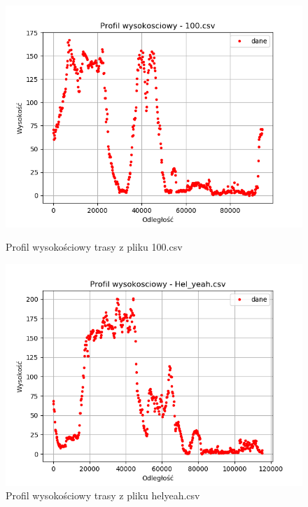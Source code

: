 \documentclass{article} %
\begin{document}
\begin{figure}[h!]
    \centering
    \begin{minipage}[b]{0.4\textwidth}
        \includegraphics[width=\textwidth]{profile_wysokosciowe/100_pw.png}
        \caption{Profil wysokościowy trasy z pliku 100.csv}
    \end{minipage}
    \hfill
    \begin{minipage}[b]{0.4\textwidth}
        \includegraphics[width=\textwidth]{profile_wysokosciowe/hy_pw.png}
        \caption{Profil wysokościowy trasy z pliku helyeah.csv}
    \end{minipage}
    \centering
    \begin{minipage}[b]{0.4\textwidth}

\end{minipage}
\end{figure}
\end{document}
